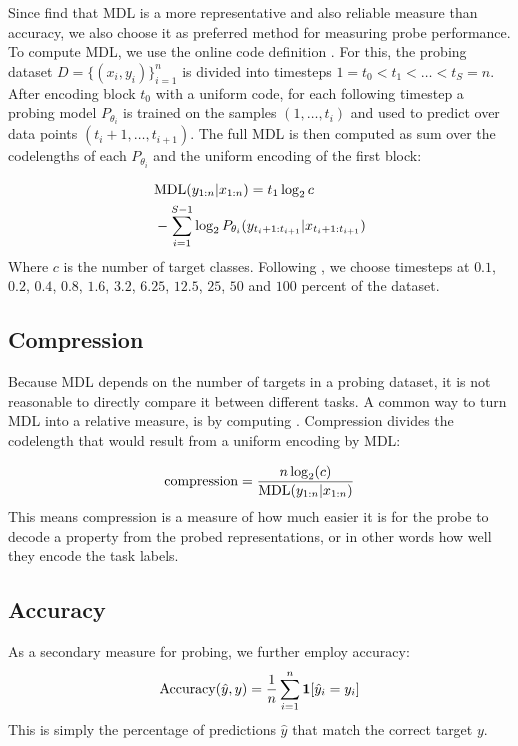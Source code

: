 Since \cite{voita-titov-2020-information} find that MDL is a more representative and also reliable measure than accuracy, we also choose it as preferred method for measuring probe performance. To compute MDL, we use the online code definition \cite{Rissanen1984UniversalCI}.
For this, the probing dataset $D=\{(x_i, y_i)\}_{i=1}^n$ is divided into timesteps $1=t_0 < t_1 < \ldots < t_S = n$. After encoding block $t_0$ with a uniform code, for each following timestep a probing model $P_{\theta_i}$ is trained on the samples $(1, \ldots, t_i)$ and used to predict over data points $(t_i + 1,\ldots, t_{i + 1})$. The full MDL is then computed as sum over the codelengths of each $P_{\theta_i}$ and the uniform encoding of the first block:

\begin{equation}
    \begin{aligned}
         & \text{MDL}(y_{1:n} | x_{1:n}) = t_1 \log_2 c                                        \\
         & - \sum_{i=1}^{S-1} \log_2 P_{\theta_i}(y_{t_i + 1:t_{i+1}} | x_{t_i + 1:t_{i+1}})
    \end{aligned}
\end{equation}
Where $c$ is the number of target classes.
Following \cite{voita-titov-2020-information}, we choose timesteps at $0.1$, $0.2$, $0.4$, $0.8$, $1.6$, $3.2$, $6.25$, $12.5$, $25$, $50$ and $100$ percent of the dataset.

\subsection{Compression}
Because MDL depends on the number of targets in a probing dataset, it is not reasonable to directly compare it between different tasks. A common way to turn MDL into a relative measure, is by computing . Compression divides the codelength that would result from a uniform encoding by MDL:

\begin{equation}
    \text{compression} = \frac{n \log_2(c)}{\text{MDL}(y_{1:n} | x_{1:n})}
\end{equation}
This means compression is a measure of how much easier it is for the probe to decode a property from the probed representations, or in other words how well they encode the task labels.

\subsection{Accuracy}
As a secondary measure for probing, we further employ accuracy:
\begin{equation}
    \text{Accuracy}(\hat{y}, y) = \frac{1}{n} \sum_{i=1}^n \mathbf{1} [\hat{y}_i = y_i]
\end{equation}
This is simply the percentage of predictions $\hat{y}$ that match the correct target $y$.

